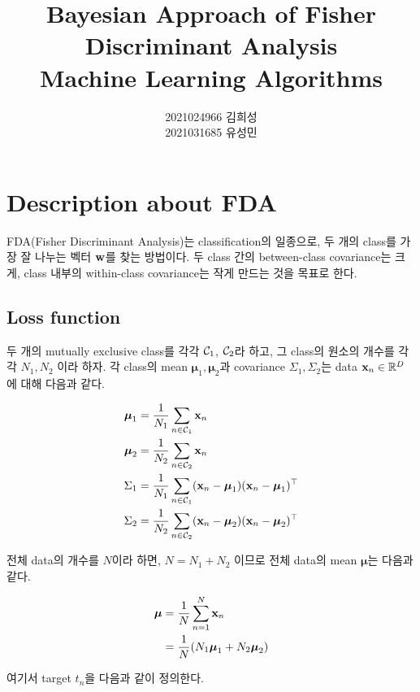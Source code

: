 \documentclass{article} %
\title {\textbf{Bayesian Approach of Fisher Discriminant Analysis} \\[1ex] \large Machine Learning Algorithms}
\author{2021024966 김희성\\2021031685 유성민}
\date{}
\begin{document}
	
\maketitle

\section{Description about FDA}
FDA(Fisher Discriminant Analysis)는 classification의 일종으로, 두 개의 class를 가장 잘 나누는 벡터 $\bf w$를 찾는 방법이다. 두 class 간의 between-class covariance는 크게, class 내부의 within-class covariance는 작게 만드는 것을 목표로 한다.

\subsection{Loss function}
두 개의 mutually exclusive class를 각각 ${\cal C}_1$, ${\cal C}_2$라 하고, 그 class의 원소의 개수를 각각 $N_1, N_2$ 이라 하자. 각 class의 mean $\boldsymbol{\mu}_1, \boldsymbol{\mu}_2$과 covariance $\Sigma_1, \Sigma_2$는 data ${\bf x}_n \in \mathbb{R}^D$에 대해 다음과 같다.

\begin{equation}
\begin{aligned}
	\boldsymbol{\mu}_1 &= \frac{1}{N_1}\sum_{n \in {\cal C}_1} {\bf x}_n \\
	\boldsymbol{\mu}_2 &= \frac{1}{N_2}\sum_{n \in {\cal C}_2} {\bf x}_n \\
	\Sigma_1 &= \frac{1}{N_1} \sum_{n \in {\cal C}_1} ({\bf x}_n - \boldsymbol{\mu}_1)({\bf x}_n - \boldsymbol{\mu}_1)^\top \\
	\Sigma_2 &= \frac{1}{N_2} \sum_{n \in {\cal C}_2} ({\bf x}_n - \boldsymbol{\mu}_2)({\bf x}_n - \boldsymbol{\mu}_2)^\top
\end{aligned}
\end{equation}

전체 data의 개수를 $N$이라 하면, $N = N_1 + N_2$ 이므로 전체 data의 mean $\boldsymbol{\mu}$는 다음과 같다.

\begin{equation}
\begin{aligned}
	\boldsymbol{\mu} &= \frac{1}{N} \sum_{n =1}^N {\bf x}_n \\
	&= \frac{1}{N} (N_1 \boldsymbol{\mu}_1 + N_2 \boldsymbol{\mu}_2)
\end{aligned}
\end{equation}

여기서 target $t_n$을 다음과 같이 정의한다.
\end{document}

